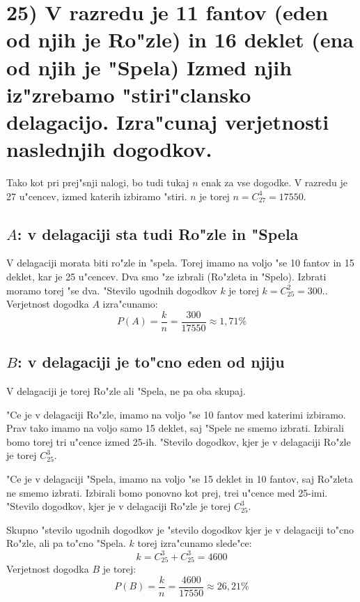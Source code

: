\documentclass[a4paper, 12pt]{article}
\begin{document}
\section*{25) V razredu je 11 fantov (eden od njih je Ro"zle) in 16 deklet (ena od njih je "Spela) Izmed njih iz"zrebamo "stiri"clansko delagacijo. Izra"cunaj verjetnosti naslednjih dogodkov.}
Tako kot pri prej"snji nalogi, bo tudi tukaj $n$ enak za vse dogodke. V razredu je 27 u"cencev, izmed katerih izbiramo "stiri. $n$ je torej $n = C_{27}^4 = 17550$.

\subsection*{$A$: v delagaciji sta tudi Ro"zle in "Spela}
V delagaciji morata biti ro"zle in "spela. Torej imamo na voljo "se 10 fantov in 15 deklet, kar je 25 u"cencev. Dva smo "ze izbrali (Ro"zleta in "Spelo). Izbrati moramo torej "se dva. "Stevilo ugodnih dogodkov $k$ je torej $k = C_{25}^2 = 300.$. Verjetnost dogodka $A$ izra"cunamo:
\begin{equation*}
P(A) = \dfrac{k}{n} = \dfrac{300}{17550} \approx 1,71\%
\end{equation*}

\subsection*{$B$: v delagaciji je to"cno eden od njiju}
V delagaciji je torej Ro"zle ali "Spela, ne pa oba skupaj.

"Ce je v delagaciji Ro"zle, imamo na voljo "se 10 fantov med katerimi izbiramo. Prav tako imamo na voljo samo 15 deklet, saj "Spele ne smemo izbrati. Izbirali bomo torej tri u"cence izmed 25-ih. "Stevilo dogodkov, kjer je v delagaciji Ro"zle je torej $C_{25}^3$.

"Ce je v delagaciji "Spela, imamo na voljo "se 15 deklet in 10 fantov, saj Ro"zleta ne smemo izbrati. Izbirali bomo ponovno kot prej, trei u"cence med 25-imi. "Stevilo dogodkov, kjer je v delagaciji Ro"zle je torej $C_{25}^3$.

Skupno "stevilo ugodnih dogodkov je "stevilo dogodkov kjer je v delagaciji to"cno Ro"zle, ali pa to"cno "Spela. $k$ torej izra"cunamo slede"ce:
\begin{equation*}
k = C_{25}^3 + C_{25}^3 = 4600
\end{equation*}
Verjetnost dogodka $B$ je torej:
\begin{equation*}
P(B) = \dfrac{k}{n} = \dfrac{4600}{17550} \approx 26,21\%
\end{equation*}
\end{document}
